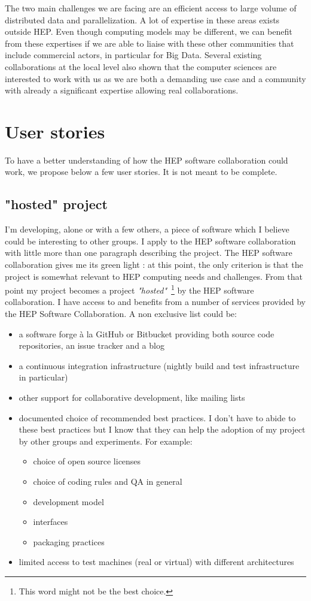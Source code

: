 \documentclass[11pt]{article} %
\begin{document}
The two main challenges we are facing are an efficient access to large
volume of distributed data and parallelization. A lot of expertise in
these areas exists outside HEP. Even though computing models may be
different, we can benefit from these expertises if we are able to
liaise with these other communities that include commercial actors,
in particular for Big Data. Several existing collaborations at the
local level also shown that the computer sciences are interested to
work with us as we are both a demanding use case and a community with
already a significant expertise allowing real collaborations.


\section{User stories}
To have a better understanding of how the HEP software collaboration could work, we propose below a few user stories. It is not meant to be complete.

\subsection{"hosted" project }
I'm developing, alone or with a few others, a piece of software which I believe could be interesting to other groups. I apply to the HEP software collaboration 
with little more than one paragraph describing the project. The HEP software collaboration gives me its green light : at this point, the only criterion is that 
the project is somewhat relevant to HEP computing needs and challenges. From that point my project becomes a project {\em "hosted"}~\footnote{This word might not be the best choice.} 
by the HEP software collaboration. I have access to and benefits from a number of services provided by the HEP Software Collaboration. A non exclusive list could be:
\begin{itemize}
\item a software forge à la GitHub or Bitbucket providing both source code repositories, an issue tracker and a blog
\item a continuous integration infrastructure (nightly build and test infrastructure in particular)
\item other support for collaborative development, like mailing lists
\item documented choice of recommended best practices. I don't have to abide to these best practices but I know that they can help the adoption of my project by other groups and experiments. For example:
\begin{itemize}
\item choice of open source licenses
\item choice of coding rules and QA in general
\item development model
\item interfaces
\item packaging practices
\end{itemize}

\item limited access to test machines (real or virtual) with different architectures
\end{itemize}
\end{document}
